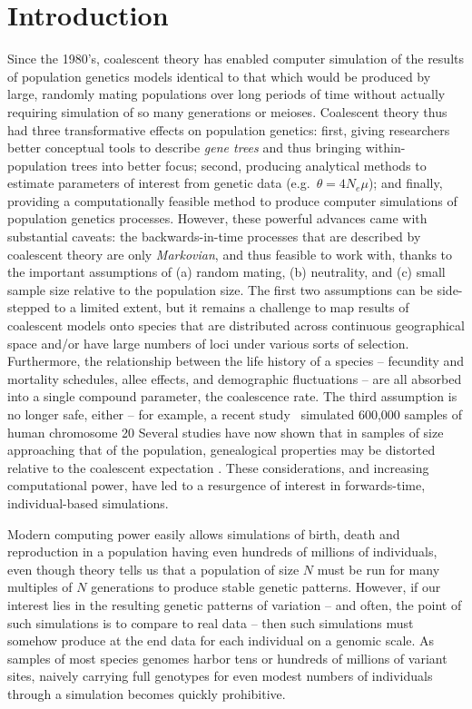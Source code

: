 \documentclass{article}
\begin{document}
\section*{Introduction}

Since the 1980's, coalescent theory has enabled computer simulation of the results of population genetics models
identical to that which would be produced by large, randomly mating populations over long periods of time
without actually requiring simulation of so many generations or meioses.
Coalescent theory thus had three transformative effects on population genetics:
first, giving researchers better conceptual tools to describe \emph{gene trees} and thus bringing within-population trees into better focus;
second, producing analytical methods to estimate parameters of interest from genetic data (e.g.\ $\theta = 4N_e \mu$);
and finally, providing a computationally feasible method to produce computer simulations of population genetics processes.
However, these powerful advances came with substantial caveats:
the backwards-in-time processes that are described by coalescent theory
are only \emph{Markovian}, and thus feasible to work with,
thanks to the important assumptions of 
(a) random mating, 
(b) neutrality,
and (c) small sample size relative to the population size.
The first two assumptions can be side-stepped to a limited extent, 
but it remains a challenge to map results of coalescent models
onto species that are distributed across continuous geographical space 
and/or have large numbers of loci under various sorts of selection.
Furthermore, the relationship between the life history of a species --
fecundity and mortality schedules, allee effects, and demographic fluctuations --
are all absorbed into a single compound parameter, the coalescence rate.
The third assumption is no longer safe, either --
for example, a recent study~\citep{martin2017human}
simulated 600,000 samples of human chromosome 20
Several studies have now shown that in samples of size approaching that of the population,
genealogical properties may be distorted relative to the coalescent expectation
\citep{wakeley2003gene,maruvka2011recovering,bhaskar2014distortion}.
These considerations, and increasing computational power, have led to a resurgence of interest in forwards-time, individual-based simulations.

Modern computing power easily allows simulations of birth, death and reproduction
in a population having even hundreds of millions of individuals,
even though theory tells us that a population of size $N$
must be run for many multiples of $N$ generations to produce stable genetic patterns.
However, if our interest lies in the resulting genetic patterns of variation
-- and often, the point of such simulations is to compare to real data --
then such simulations must somehow produce at the end data for each individual on a genomic scale.
As samples of most species genomes harbor tens or hundreds of millions of variant sites,
naively carrying full genotypes for even modest numbers of individuals through a simulation 
becomes quickly prohibitive.
\end{document}
